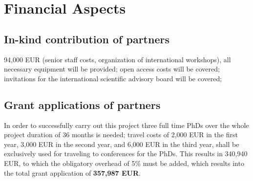 \documentclass[a4paper,11pt]{article}
\begin{document}


\section{Financial Aspects}
%

\subsection{In-kind contribution of partners}

94,000 EUR (senior staff costs, organization of international workshops), all necessary equipment will be provided; open access costs will be covered; invitations for the international scientific advisory board will be covered;
\\[0,2cm]

\subsection{Grant applications of partners}
In order to successfully carry out this project three full time PhDs over the whole project duration of 36 months is needed; travel costs of 2,000 EUR in the first year, 3,000 EUR in the second year, and 6,000 EUR in the third year, shall be exclusively used for traveling to conferences for the PhDs. This results in 340,940 EUR, to which the obligatory overhead of 5\% must be added, which results into the total grant application of \textbf{357,987 EUR}. 
\\[0,2cm]
\end{document}
